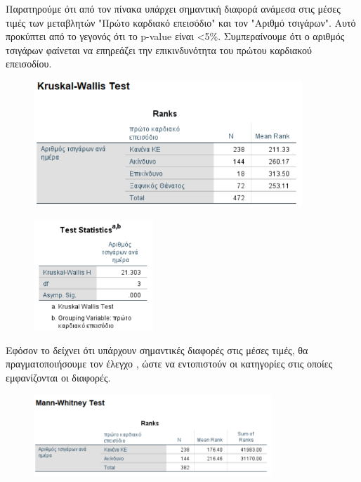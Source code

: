 Παρατηρούμε ότι από τον πίνακα \textbf{} υπάρχει σημαντική διαφορά ανάμεσα στις μέσες τιμές των μεταβλητών "Πρώτο καρδιακό επεισόδιο" και τον "Αριθμό τσιγάρων". Αυτό προκύπτει από το γεγονός ότι το p-value είναι <5\%.  Συμπεραίνουμε ότι ο αριθμός τσιγάρων φαίνεται να επηρεάζει την επικινδυνότητα του πρώτου καρδιακού επεισοδίου.

\begin{figure}[h]
    \centering
    \includegraphics[width=0.9\textwidth]{images/202.PNG}
\end{figure}

\clearpage

\begin{figure}[ht]
    \centering
    \includegraphics[width=0.4\textwidth]{images/203.PNG}
\end{figure}

Εφόσον το  δείχνει ότι υπάρχουν σημαντικές διαφορές στις μέσες τιμές, θα πραγματοποιήσουμε τον έλεγχο , ώστε να εντοπιστούν οι κατηγορίες στις οποίες εμφανίζονται οι διαφορές. 

\vspace{1cm}

\begin{figure}[ht]
    \centering
    \includegraphics[width=0.8\textwidth]{images/204.PNG}
\end{figure}

